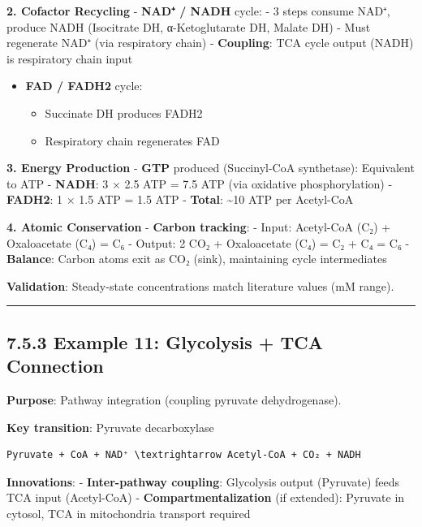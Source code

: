 \textbf{2. Cofactor Recycling} - \textbf{NAD⁺ / NADH} cycle: - 3 steps
consume NAD⁺, produce NADH (Isocitrate DH, α-Ketoglutarate DH, Malate
DH) - Must regenerate NAD⁺ (via respiratory chain) - \textbf{Coupling}:
TCA cycle output (NADH) is respiratory chain input

\begin{itemize}
\tightlist
\item
  \textbf{FAD / FADH2} cycle:

  \begin{itemize}
  \tightlist
  \item
    Succinate DH produces FADH2
  \item
    Respiratory chain regenerates FAD
  \end{itemize}
\end{itemize}

\textbf{3. Energy Production} - \textbf{GTP} produced (Succinyl-CoA
synthetase): Equivalent to ATP - \textbf{NADH}: 3 × 2.5 ATP = 7.5 ATP
(via oxidative phosphorylation) - \textbf{FADH2}: 1 × 1.5 ATP = 1.5 ATP
- \textbf{Total}: \textasciitilde10 ATP per Acetyl-CoA

\textbf{4. Atomic Conservation} - \textbf{Carbon tracking}: - Input:
Acetyl-CoA (C₂) + Oxaloacetate (C₄) = C₆ - Output: 2 CO₂ + Oxaloacetate
(C₄) = C₂ + C₄ = C₆ \checkmark - \textbf{Balance}: Carbon atoms exit as CO₂
(sink), maintaining cycle intermediates

\textbf{Validation}: Steady-state concentrations match literature values
(mM range).

\begin{center}\rule{0.5\linewidth}{0.5pt}\end{center}

\hypertarget{example-11-glycolysis-tca-connection}{%
\subsection{7.5.3 Example 11: Glycolysis + TCA
Connection}\label{example-11-glycolysis-tca-connection}}

\textbf{Purpose}: Pathway integration (coupling pyruvate dehydrogenase).

\textbf{Key transition}: Pyruvate decarboxylase

\begin{lstlisting}
Pyruvate + CoA + NAD⁺ \textrightarrow Acetyl-CoA + CO₂ + NADH
\end{lstlisting}

\textbf{Innovations}: - \textbf{Inter-pathway coupling}: Glycolysis
output (Pyruvate) feeds TCA input (Acetyl-CoA) -
\textbf{Compartmentalization} (if extended): Pyruvate in cytosol, TCA in
mitochondria \textrightarrow transport required


